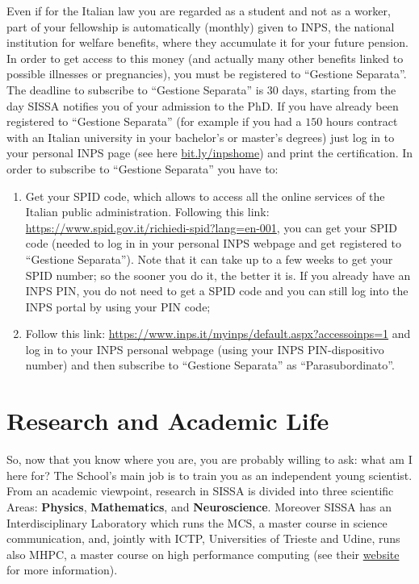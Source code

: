 \documentclass{sissavademecum}
\begin{document}
Even if for the Italian law you are regarded as a student and not as a worker, part of your fellowship is automatically (monthly) given to INPS, the national institution for welfare benefits, where they accumulate it for your future pension. In order to get access to this money (and actually many other benefits linked to possible illnesses or pregnancies), you must be registered to ``Gestione Separata''. The deadline to subscribe to ``Gestione Separata'' is $30$ days, starting from the day SISSA notifies you of your admission to the PhD. If you have already been registered to ``Gestione Separata'' (for example if you had a $150$ hours contract with an Italian university in your bachelor's or master's degrees) just log in to your personal INPS page (see here \href{https://bit.ly/inpshome}{bit.ly/inpshome}) and print the certification. In order to subscribe to ``Gestione Separata'' you have to:
\begin{enumerate}
	\item Get your SPID code, which allows to access all the online services of the Italian public administration. Following this link: \url{https://www.spid.gov.it/richiedi-spid?lang=en-001}, you can get your SPID code (needed to log in in your personal INPS webpage and get registered to ``Gestione Separata''). Note that it can take up to a few weeks to get your SPID number; so the sooner you do it, the better it is. If you already have an INPS PIN, you do not need to get a SPID code and you can still log into the INPS portal by using your PIN code;
	\item Follow this link: \url{https://www.inps.it/myinps/default.aspx?accessoinps=1} and log in to your INPS personal webpage (using your INPS PIN-dispositivo number) and then subscribe to ``Gestione Separata'' as ``Parasubordinato''.
\end{enumerate}


\chapter{Research and Academic Life}

So, now that you know where you are, you are probably willing to ask: what am I here for? The School's main job is to train you as an independent young scientist. From an academic viewpoint, research in SISSA is divided into three scientific Areas: \textbf{Physics}, \textbf{Mathematics}, and \textbf{Neuroscience}. Moreover SISSA has an Interdisciplinary Laboratory which runs the MCS, a master course in science communication, and, jointly with ICTP, Universities of Trieste and Udine, runs also MHPC, a master course on high performance computing (see their \href{https://www.sissa.it/ilas/}{website} for more information).
\end{document}
